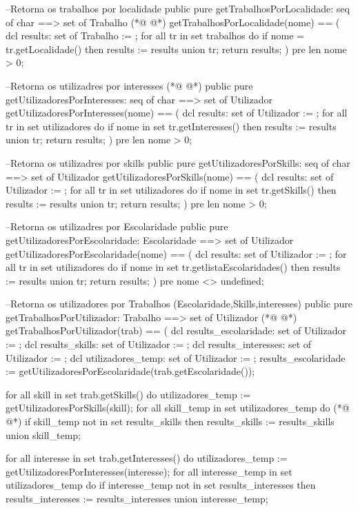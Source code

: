 \begin{vdmpp}[breaklines=true]
 --Retorna os trabalhos por localidade
 public pure getTrabalhosPorLocalidade: seq of char ==> set of Trabalho
(*@
\label{getUtilizadoresPorSkills:139}
@*)
 getTrabalhosPorLocalidade(nome) == (
  dcl results: set of Trabalho := {};
  for all tr in set trabalhos do
   if nome = tr.getLocalidade() then
    results := results union {tr};
  return results;
 )
 pre len nome > 0;
 
 --Retorna os utilizadres por interesses
(*@
\label{getUtilizadoresPorEscolaridade:149}
@*)
 public pure getUtilizadoresPorInteresses: seq of char ==> set of Utilizador
 getUtilizadoresPorInteresses(nome) == (
  dcl results: set of Utilizador := {};
  for all tr in set utilizadores do
   if nome in set tr.getInteresses() then
    results := results union {tr};
  return results;
 )
 pre len nome > 0;
 
 --Retorna os utilizadres por skills
 public pure getUtilizadoresPorSkills: seq of char ==> set of Utilizador
 getUtilizadoresPorSkills(nome) == (
  dcl results: set of Utilizador := {};
  for all tr in set utilizadores do
   if nome in set tr.getSkills() then
    results := results union {tr};
  return results;
 )
 pre len nome > 0;

 --Retorna os utilizadres por Escolaridade
 public pure getUtilizadoresPorEscolaridade: Escolaridade ==> set of Utilizador
 getUtilizadoresPorEscolaridade(nome) == (
  dcl results: set of Utilizador := {};
  for all tr in set utilizadores do
   if nome in set tr.getlistaEscolaridades() then
    results := results union {tr};
  return results;
 )
 pre nome <> undefined;
 
 --Retorna os utilizadores por Trabalhos (Escolaridade,Skills,interesses)
 public pure getTrabalhosPorUtilizador: Trabalho ==> set of Utilizador
(*@
\label{sameUser:183}
@*)
 getTrabalhosPorUtilizador(trab) == (
  dcl results_escolaridade: set of Utilizador := {};
  dcl results_skills: set of Utilizador := {};
  dcl results_interesses: set of Utilizador := {};
  dcl utilizadores_temp: set of Utilizador := {};
  results_escolaridade := getUtilizadoresPorEscolaridade(trab.getEscolaridade());
  
  for all skill in set trab.getSkills() do
   utilizadores_temp := getUtilizadoresPorSkills(skill);
   for all skill_temp in set utilizadores_temp do
(*@
\label{sameTrabalho:193}
@*)
    if skill_temp not in set results_skills then
     results_skills := results_skills union {skill_temp};
     
  for all interesse in set trab.getInteresses() do
   utilizadores_temp := getUtilizadoresPorInteresses(interesse);
   for all interesse_temp in set utilizadores_temp do
    if interesse_temp not in set results_interesses then
     results_interesses := results_interesses union {interesse_temp};
     

\end{vdmpp}
